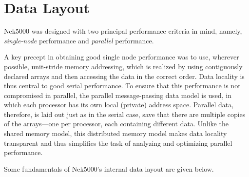 \section{Data Layout}
\label{sec:data_layout}

Nek5000 was designed with two principal performance criteria in mind,
namely, {\em single-node} performance and {\em parallel} performance.

A key precept in obtaining good single node performance was to use,
wherever possible, unit-stride memory addressing, which is realized by
using contiguously declared arrays and then accessing the data in
the correct order.   Data locality is thus central to good serial 
performance.   To ensure that this performance is not compromised
in parallel, the parallel message-passing data model is used, in which
each processor has its own local (private) address space.  Parallel
data, therefore, is laid out just as in the serial case, save that there
are multiple copies of the arrays---one per processor, each containing 
different data.  Unlike the shared memory model, this distributed memory
model makes data locality transparent and thus simplifies the task of
analyzing and optimizing parallel performance.

Some fundamentals of Nek5000's internal data layout are given below.

